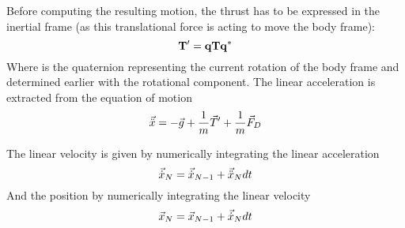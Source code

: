 Before computing the resulting motion, the thrust has to be expressed in the
inertial frame (as this translational force is acting to move the body frame):
\begin{equation}
	\mathbf{T'} = \mathbf{q}\mathbf{T}\mathbf{q^*}
\end{equation}
Where  is the quaternion representing the current rotation of the body
frame and determined earlier with the rotational component.
The linear acceleration is extracted from the equation of motion
\begin{equation}
	\vec{\ddot{x}} = -\vec{g} + \frac{1}{m}\vec{T}' + \frac{1}{m}\vec{F}_D
\end{equation}

The linear velocity is given by numerically integrating the linear acceleration 
\begin{equation}
	\vec{\dot{x}}_N = \vec{\dot{x}}_{N-1} + \vec{\ddot{x}}_N dt
\end{equation}
And the position by numerically integrating the linear velocity
\begin{equation}
	\vec{x}_N = \vec{x}_{N-1} + \vec{\dot{x}}_N dt
\end{equation}


